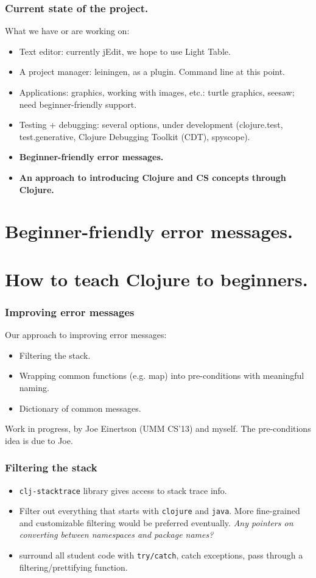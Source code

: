 \documentclass{beamer}
\begin{document}
\begin{frame}
  \frametitle{Current state of the project.}
What we have or are working on:
\begin{itemize}
\item Text editor: currently jEdit, we hope to use Light Table. 
\item A project manager: leiningen, as a plugin. Command line at this point. 
\item Applications: graphics, working with images, etc.: turtle graphics, seesaw; need beginner-friendly support.
\item Testing + debugging: several options, under development (clojure.test, test.generative, Clojure Debugging Toolkit (CDT), spyscope).
\item{\bf  Beginner-friendly error messages.}
\item {\bf An approach to introducing Clojure and CS concepts through Clojure. }
\end{itemize}
\end{frame}

\section{Beginner-friendly error messages.}

\section{How to teach Clojure to beginners.}


\begin{frame}
  \frametitle{Improving error messages}
Our approach to improving error messages:
\begin{itemize}
\item Filtering the stack. 
\item Wrapping common functions (e.g. map) into pre-conditions with meaningful naming. 
\item Dictionary of common messages.
\end{itemize}
Work in progress, by Joe Einertson (UMM CS'13) and myself. The pre-conditions idea is due to Joe. 
\end{frame}


\begin{frame}
  \frametitle{Filtering the stack}
\begin{itemize}
\item {\tt clj-stacktrace} library gives access to stack trace info. 
\item Filter out everything that starts with {\tt clojure} and {\tt java}. More fine-grained and customizable filtering would be preferred eventually. {\it Any pointers on converting between namespaces and package names?}
\item surround all student code with {\tt try/catch}, catch exceptions, pass through a filtering/prettifying function. 
\end{itemize}
\end{frame}
\end{document}
